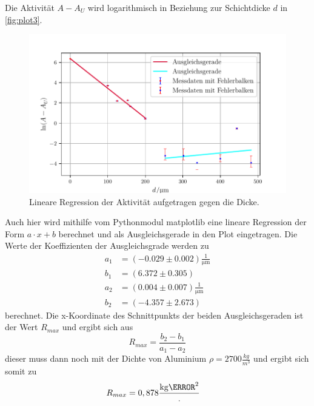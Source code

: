  Die Aktivität $A-A_U$ wird logarithmisch in Beziehung zur Schichtdicke $d$ in \autoref{fig:plot3}.
\begin{figure}[H]
  \centering
  \includegraphics{build/plot3.pdf}
  \caption {Lineare Regression der Aktivität aufgetragen gegen die Dicke.}
  \label{fig:plot3}
\end{figure}

Auch hier wird mithilfe vom Pythonmodul matplotlib \cite{matplotlib} eine lineare Regression der Form $a \cdot x + b$ berechnet und 
als Ausgleichsgerade in den Plot eingetragen. 
Die Werte der Koeffizienten der Ausgleichsgrade werden zu
\begin{align*}
  a_1 &= (-0.029 \pm 0.002) \frac{1}{\si{\micro\meter}}\\
  b_1 &= (6.372 \pm 0.305) \\
  a_2 &= (0.004 \pm 0.007) \frac{1}{\si{\micro\meter}}\\
  b_2 &= (-4.357 \pm 2.673)
\end{align*}
berechnet.
Die x-Koordinate des Schnittpunkts der beiden Ausgleichsgeraden ist der Wert $R_{max}$ und ergibt
sich aus
\begin{equation}
  R_{max} =  \frac{b_2 - b_1}{a_1 - a_2}
  \label{eqn:Rmax}
\end{equation}
dieser muss dann noch mit der Dichte von Aluminium $\rho = 2700 \frac{kg}{m^3}$\cite{AlDichte} und ergibt sich somit zu
\begin{align}
  R_{max} &= 0,878 \frac{\si{kg}{\meter^2}}.
\end{align}

